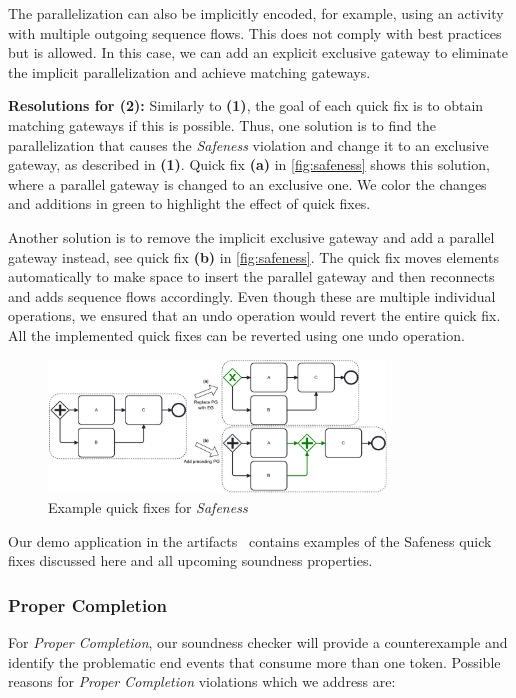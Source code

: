 \documentclass[runningheads]{llncs}
\begin{document}
The parallelization can also be implicitly encoded, for example, using an activity with multiple outgoing sequence flows.
This does not comply with best practices~\cite{camundaservicesgmbhBpmnlint2024} but is allowed.
In this case, we can add an explicit exclusive gateway to eliminate the implicit parallelization and achieve matching gateways.

\textbf{Resolutions for (2):} Similarly to \textbf{(1)}, the goal of each quick fix is to obtain matching gateways if this is possible.
Thus, one solution is to find the parallelization that causes the \textit{Safeness} violation and change it to an exclusive gateway, as described in \textbf{(1)}.
Quick fix \textbf{(a)} in \autoref{fig:safeness} shows this solution, where a parallel gateway is changed to an exclusive one.
We color the changes and additions in green to highlight the effect of quick fixes.

Another solution is to remove the implicit exclusive gateway and add a parallel gateway instead, see quick fix \textbf{(b)} in \autoref{fig:safeness}.
The quick fix moves elements automatically to make space to insert the parallel gateway and then reconnects and adds sequence flows accordingly.
Even though these are multiple individual operations, we ensured that an undo operation would revert the entire quick fix.
All the implemented quick fixes can be reverted using one undo operation.

\begin{figure}[ht]
	\centering
	\includegraphics[width=0.8\textwidth]{images/safeness}
	\caption{Example quick fixes for \textit{Safeness}}
	\label{fig:safeness}
\end{figure}

Our demo application in the artifacts~\cite{noauthorgivenBPM2024Artifacts2024} contains examples of the Safeness quick fixes discussed here and all upcoming soundness properties.

\subsubsection{Proper Completion}
For \textit{Proper Completion}, our soundness checker will provide a counterexample and identify the problematic end events that consume more than one token.
Possible reasons for \textit{Proper Completion} violations which we address are:
\end{document}
